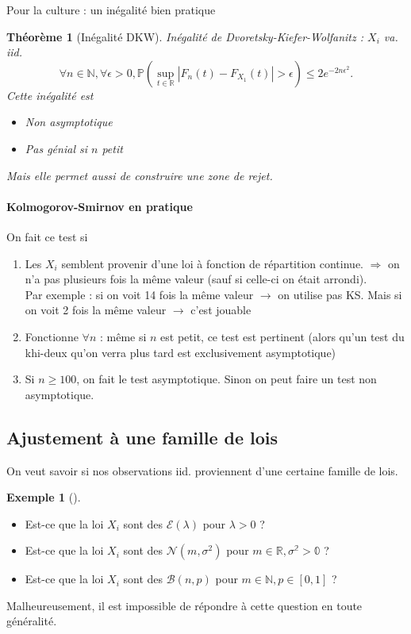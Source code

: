 \documentclass{article}
\theoremstyle{plain}%
\newtheorem{thm}{Théorème}[section]
\theoremstyle{definition}
\newtheorem{exmp}{Exemple}[section]
\theoremstyle{remark}
\begin{document}
Pour la culture : un inégalité bien pratique 
\begin{thm}[Inégalité DKW]
    Inégalité de Dvoretsky-Kiefer-Wolfanitz : $ X_i $ va. iid.
    \[
        \forall n \in \mathbb{N}, \forall \epsilon > 0, \mathbb{P}(\sup _{t \in \mathbb{R}} \left| F_n(t) - F_{X_1}(t) \right| > \epsilon ) \leq 2 e^{-2n \epsilon ^2}
    .\]
    Cette inégalité est \begin{itemize}
        \item Non asymptotique
        \item Pas génial si $ n $ petit
    \end{itemize}
    Mais elle permet aussi de construire une zone de rejet.
\end{thm}

\paragraph{Kolmogorov-Smirnov en pratique}
On fait ce test si 
\begin{enumerate}
    \item Les $ X_i $ semblent provenir d'une loi à fonction de répartition continue. $ \Rightarrow  $ on n'a pas plusieurs fois la même valeur (sauf si celle-ci on était arrondi).\\
    Par exemple : si on voit 14 fois la même valeur $\rightarrow$ on utilise pas KS. Mais si on voit 2 fois la même valeur $\rightarrow$ c'est jouable
    \item Fonctionne $ \forall n $ : même si $ n $ est petit, ce test est pertinent (alors qu'un test du khi-deux qu'on verra plus tard est exclusivement asymptotique)
    \item Si $ n \geq 100 $, on fait le test asymptotique. Sinon on peut faire un test non asymptotique.
\end{enumerate}

\subsection{Ajustement à une famille de lois}
On veut savoir si nos observations iid. proviennent d'une certaine famille de lois. 
\begin{exmp}[]
    \begin{itemize}
        \item Est-ce que la loi $ X_i $ sont des $ \mathcal{E}(\lambda) $ pour $ \lambda >0 $ ?
        \item Est-ce que la loi $ X_i $ sont des $ \mathcal{N}(m, \sigma ^2) $ pour $ m \in \mathbb{R, \sigma ^2 > 0} $ ?
        \item Est-ce que la loi $ X_i $ sont des $ \mathcal{B}(n,p) $ pour $ m \in \mathbb{N}, p \in [0,1] $ ?
    \end{itemize}
\end{exmp}
Malheureusement, il est impossible de répondre à cette question en toute généralité. 
\end{document}

